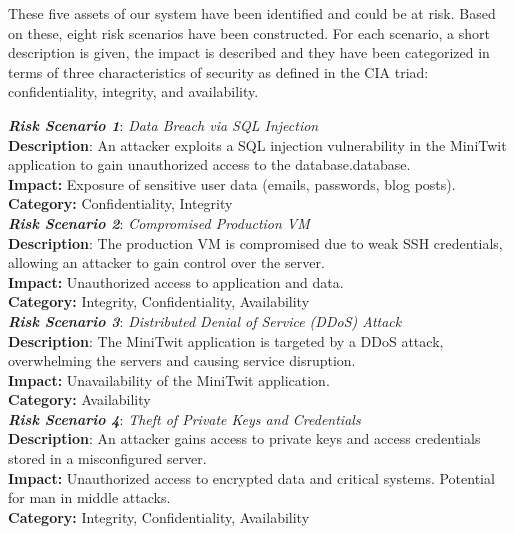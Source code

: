 \documentclass{article}
\begin{document}
These five assets of our system have been identified and could be at risk. Based on these, eight risk scenarios have been constructed. For each scenario, a short description is given, the impact is described and they have been categorized in terms of three characteristics of security as defined in the CIA triad: confidentiality, integrity, and availability.

\begin{multicols}{2}


\textit{\textbf{Risk Scenario 1}}: \textit{Data Breach via SQL Injection} \\
\textbf{Description}: An attacker exploits a SQL injection vulnerability in the MiniTwit application to gain unauthorized access to the database.database.\\
\textbf{Impact:} Exposure of sensitive user data (emails, passwords, blog posts).\\
\textbf{Category:} Confidentiality, Integrity\\

\textit{\textbf{Risk Scenario 2}}: \textit{Compromised Production VM} \\
\textbf{Description}: The production VM is compromised due to weak SSH credentials, allowing an attacker to gain control over the server.\\
\textbf{Impact:} Unauthorized access to application and data.\\
\textbf{Category:}  Integrity, Confidentiality, Availability \\

\textit{\textbf{Risk Scenario 3}}: \textit{Distributed Denial of Service (DDoS) Attack} \\
\textbf{Description}: The MiniTwit application is targeted by a DDoS attack, overwhelming the servers and causing service disruption.\\
\textbf{Impact:} Unavailability of the MiniTwit application.\\
\textbf{Category:} Availability \\

\textit{\textbf{Risk Scenario 4}}: \textit{Theft of Private Keys and Credentials} \\
\textbf{Description}: An attacker gains access to private keys and access credentials stored in a misconfigured server.\\
\textbf{Impact:}  Unauthorized access to encrypted data and critical systems. Potential for man in middle attacks.\\
\textbf{Category:} Integrity, Confidentiality, Availability \\


\end{multicols}
\end{document}
